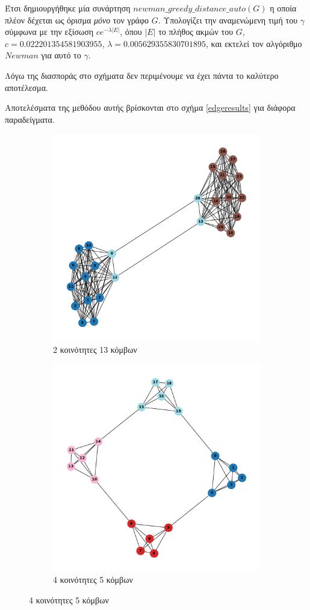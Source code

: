 \documentclass[12pt, letterpaper]{article}
\begin{document}
Έτσι δημιουργήθηκε μία συνάρτηση $newman\_greedy\_distance\_auto(G)$ η οποία πλέον
δέχεται ως όρισμα \emph{μόνο} τον γράφο $G$. Υπολογίζει την αναμενώμενη τιμή του $\gamma$
σύμφωνα με την εξίσωση $ce^{-\lambda |E|}$, όπου $|E|$ το πλήθος ακμών του $G$, 
$c=0.022201354581903955$, $\lambda = 0.005629355830701895$, και εκτελεί τον αλγόριθμο $Newman$ για αυτό το $\gamma$. 

Λόγω της διασποράς στο σχήματα δεν περιμένουμε να έχει πάντα το καλύτερο
αποτέλεσμα.

Αποτελέσματα της μεθόδου αυτής βρίσκονται στο σχήμα \ref{edgeresults} για διάφορα παραδείγματα. 










\begin{figure}
  \begin{subfigure}{0.5\textwidth}
    \centering
    \includegraphics[width=0.6\linewidth]{AUTO2,13.pdf}
    \caption{2 κοινότητες 13 κόμβων}
    \label{}
  \end{subfigure}
  \begin{subfigure}{0.5\textwidth}
    \centering
    \includegraphics[width=0.6\linewidth]{AUTO4,5.pdf}
    \caption{4 κοινότητες 5 κόμβων}
    \label{}
  \end{subfigure}


\end{figure}
\end{document}

